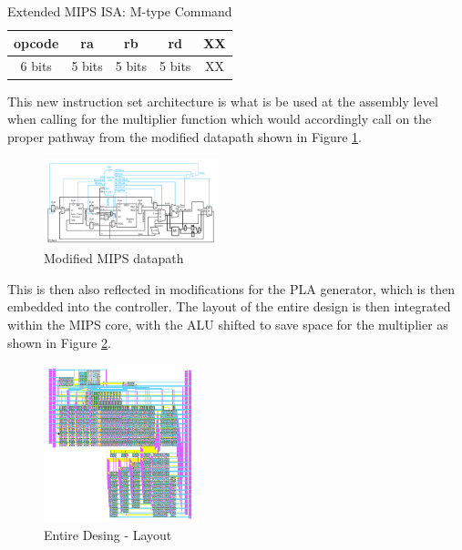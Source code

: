 \documentclass[journal]{IEEEtran}
\begin{document}
\begin{table}[!h]
\renewcommand{\arraystretch}{1.5}
\caption{Extended MIPS ISA: M-type Command}
\label{tab:t7}
\centering
\begin{tabular}{|c|c|c|c|c|}
\hline
\textbf{opcode}&\textbf{ra} & \textbf{rb} & \textbf{rd} &\textbf{XX}\\\hline
6 bits & 5 bits & 5 bits & 5 bits & XX\\\hline
\end{tabular}
\end{table}


This new instruction set architecture is what is be used at the assembly level when calling for the multiplier function which would accordingly call on the proper pathway from the modified datapath shown in Figure \ref{fig:10}.

\vspace{-10pt}

\begin{figure}[h!]
  \centering
  \includegraphics[width=0.45\textwidth]{10.png}
  \centering
  \caption{Modified MIPS datapath}
  \label{fig:10}
\end{figure}


This is then also reflected in modifications for the PLA generator, which is then embedded into the controller. The layout of the entire design is then integrated within the MIPS core, with the ALU shifted to save space for the multiplier as shown in Figure \ref{fig:11}.

\begin{figure}[h!]
  \centering
  \includegraphics[width=0.4\textwidth]{11.png}
  \centering
  \caption{Entire Desing - Layout}
  \label{fig:11}
\end{figure}
\end{document}
